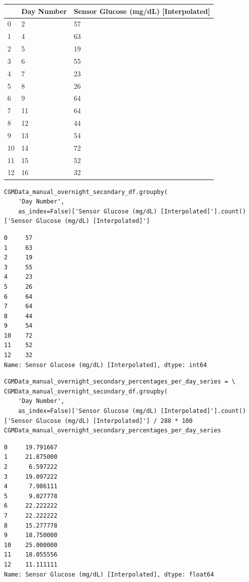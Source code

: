 \bigskip\noindent
\begin{tabular}{p{}p{}p{}}
\toprule
 & Day Number & Sensor Glucose (mg/dL) [Interpolated] \\
\hline
0 & 2 & 57 \\
\hline
1 & 4 & 63 \\
\hline
2 & 5 & 19 \\
\hline
3 & 6 & 55 \\
\hline
4 & 7 & 23 \\
\hline
5 & 8 & 26 \\
\hline
6 & 9 & 64 \\
\hline
7 & 11 & 64 \\
\hline
8 & 12 & 44 \\
\hline
9 & 13 & 54 \\
\hline
10 & 14 & 72 \\
\hline
11 & 15 & 52 \\
\hline
12 & 16 & 32 \\
\hline
\bottomrule
\end{tabular}

\bigskip

\begin{verbatim}
CGMData_manual_overnight_secondary_df.groupby(
    'Day Number', 
    as_index=False)['Sensor Glucose (mg/dL) [Interpolated]'].count()['Sensor Glucose (mg/dL) [Interpolated]']
\end{verbatim}

\begin{verbatim}
0     57
1     63
2     19
3     55
4     23
5     26
6     64
7     64
8     44
9     54
10    72
11    52
12    32
Name: Sensor Glucose (mg/dL) [Interpolated], dtype: int64
\end{verbatim}

\begin{verbatim}
CGMData_manual_overnight_secondary_percentages_per_day_series = \
CGMData_manual_overnight_secondary_df.groupby(
    'Day Number', 
    as_index=False)['Sensor Glucose (mg/dL) [Interpolated]'].count()['Sensor Glucose (mg/dL) [Interpolated]'] / 288 * 100
CGMData_manual_overnight_secondary_percentages_per_day_series
\end{verbatim}

\begin{verbatim}
0     19.791667
1     21.875000
2      6.597222
3     19.097222
4      7.986111
5      9.027778
6     22.222222
7     22.222222
8     15.277778
9     18.750000
10    25.000000
11    18.055556
12    11.111111
Name: Sensor Glucose (mg/dL) [Interpolated], dtype: float64
\end{verbatim}

